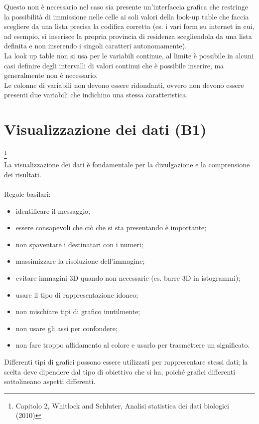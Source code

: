 \documentclass[10pt, draft]{book}
\begin{document}
Questo non è necessario nel caso sia presente un’interfaccia grafica che restringe la possibilità di immissione nelle celle ai soli valori della look-up table che faccia scegliere da una lista precisa la codifica corretta (es. i vari form su internet in cui, ad esempio, si inserisce la propria provincia di residenza scegliendola da una lista definita e non inserendo i singoli caratteri autonomamente).
\\
La look up table non si usa per le variabili continue, al limite è possibile in alcuni casi definire degli intervalli di valori continui che è possibile inserire, ma generalmente non è necessario.
\\
Le colonne di variabili non devono essere ridondanti, ovvero non devono essere presenti due variabili che indichino una stessa caratteristica.

\chapter{Visualizzazione dei dati (B1)}\footnote{Capitolo 2, Whitlock and Schluter, Analisi statistica dei dati biologici (2010)}
\\
La visualizzazione dei dati è fondamentale per la divulgazione e la comprensione dei risultati.
\\
\\
Regole basilari:
\begin{itemize}
    \item identificare il messaggio;
    \item essere consapevoli che ciò che si sta presentando è importante;
    \item non spaventare i destinatari con i numeri;
    \item massimizzare la risoluzione dell’immagine;
    \item evitare immagini 3D quando non necessarie (es. barre 3D in istogrammi);
    \item usare il tipo di rappresentazione idoneo;
    \item non mischiare tipi di grafico inutilmente;
    \item non usare gli assi per confondere;
    \item non fare troppo affidamento al colore e usarlo per trasmettere un significato.
\end{itemize}
Differenti tipi di grafici possono essere utilizzati per rappresentare stessi dati; la scelta deve dipendere dal tipo di obiettivo che si ha, poiché grafici differenti sottolineano aspetti differenti.
\end{document}
